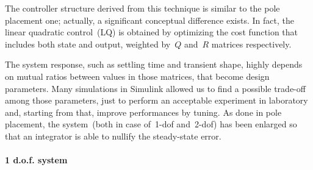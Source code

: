 
The controller structure derived from this technique is similar to the pole placement one; actually, a significant conceptual difference exists. In fact, the linear quadratic control~(LQ) is obtained by optimizing the cost function that includes both state and output, weighted by~$Q$ and~$R$ matrices respectively.

The system response, such as settling time and transient shape, highly depends on mutual ratios between values in those matrices, that become design parameters. Many simulations in Simulink allowed us to find a possible trade-off among those parameters, just to perform an acceptable experiment in laboratory and, starting from that, improve performances by tuning.
As done in pole placement, the system~(both in case of~1-dof and~2-dof) has been enlarged so that an integrator is able to nullify the steady-state error.

\paragraph{1 d.o.f. system}

